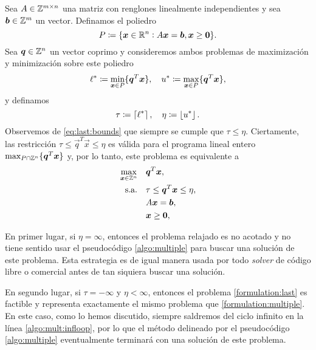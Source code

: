 Sea $A \in \mathbb{Z}^{m \times n}$ una matriz con renglones linealmente independientes y sea $\boldsymbol{b} \in
\mathbb{Z}^m$ un vector. Definamos el poliedro
\begin{equation*}
	P \coloneq \lbrace  \boldsymbol{x} \in \mathbb{R}^n \vcentcolon A\boldsymbol{x} = \boldsymbol{b}, \boldsymbol{x} \geq \boldsymbol{0}  \rbrace.
\end{equation*}
Sea $\boldsymbol{q} \in \mathbb{Z}^n$ un vector coprimo y consideremos ambos problemas de maximización y
minimización sobre este poliedro
\begin{equation}
	\label{eq:last:bounds}
	\ell^* \coloneq \min_{\boldsymbol{x} \in P}\lbrace \boldsymbol{q}^T\boldsymbol{x} \rbrace,\quad
	u^* \coloneq \max_{\boldsymbol{x} \in P}\lbrace \boldsymbol{q}^T\boldsymbol{x} \rbrace,
\end{equation}
y definamos
\begin{equation}
	\tau \coloneq \left\lceil \ell^* \right\rceil,\quad \eta \coloneq \left\lfloor u^* \right\rfloor.
\end{equation}
Observemos de \eqref{eq:last:bounds} que siempre se cumple que $\tau \leq \eta$. Ciertamente, las
restricción $\tau \leq \vec{q}^T\vec{x} \leq \eta$ es válida para el programa lineal entero $\max_{P
\cap \mathbb{Z}^n} \lbrace \boldsymbol{q}^T\boldsymbol{x} \rbrace$ y, por lo tanto, este problema es equivalente a 
\begin{subequations}
	\label{formulation:last}
	\begin{align}
		\max_{\boldsymbol{x} \in \mathbb{Z}^n} \quad
			& \boldsymbol{q}^T\boldsymbol{x}, \label{formulation:last:objective} \\
		\text{s.a.} \quad
			& \tau \leq \boldsymbol{q}^T\boldsymbol{x} \leq \eta, \\
			& A\boldsymbol{x} = \boldsymbol{b}, \label{formulation:last:constraints} \\
			& \boldsymbol{x} \geq \boldsymbol{0}, \nonumber
	\end{align}
\end{subequations}

En primer lugar, si $\eta = \infty$, entonces el problema relajado es no acotado y no tiene sentido
usar el pseudocódigo \eqref{algo:multiple} para buscar una solución de este problema. Esta estrategia
es de igual manera usada por todo \textit{solver} de código libre o comercial antes de tan siquiera
buscar una solución.

En segundo lugar, si $\tau = -\infty$ y $\eta < \infty$, entonces el problema
\eqref{formulation:last} es factible y representa exactamente el mismo problema que
\eqref{formulation:multiple}. En este caso, como lo hemos discutido, siempre saldremos del ciclo
infinito en la línea \ref{algo:mult:infloop}, por lo que el método delineado por el pseudocódigo
\eqref{algo:multiple} eventualmente terminará con una solución de este problema.

